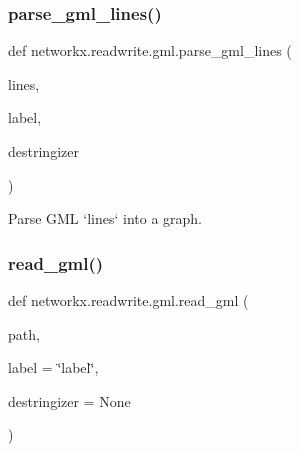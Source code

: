 \subsubsection{\texorpdfstring{parse\+\_\+gml\+\_\+lines()}{parse\_gml\_lines()}}
{\footnotesize\ttfamily def networkx.\+readwrite.\+gml.\+parse\+\_\+gml\+\_\+lines (\begin{DoxyParamCaption}\item[{}]{lines,  }\item[{}]{label,  }\item[{}]{destringizer }\end{DoxyParamCaption})}

\begin{DoxyVerb}Parse GML `lines` into a graph.\end{DoxyVerb}
 \mbox{\label{namespacenetworkx_1_1readwrite_1_1gml_aba571a8a92b3ebcce57b824d466821b6}} 
\subsubsection{\texorpdfstring{read\+\_\+gml()}{read\_gml()}}
{\footnotesize\ttfamily def networkx.\+readwrite.\+gml.\+read\+\_\+gml (\begin{DoxyParamCaption}\item[{}]{path,  }\item[{}]{label = {\ttfamily \char`\"{}label\char`\"{}},  }\item[{}]{destringizer = {\ttfamily None} }\end{DoxyParamCaption})}

